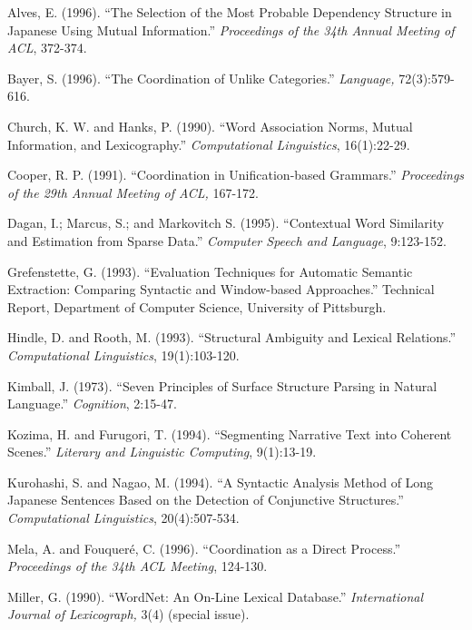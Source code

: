 \begin{thebibliography}{18}



Alves, E.  (1996). ``The Selection of 
the Most Probable Dependency Structure in Japanese Using Mutual
Information.'' {\it Proceedings of the 34th Annual Meeting of ACL}, 372-374.

 Bayer, S. (1996). ``The Coordination of Unlike
Categories.'' {\it Language,} 72(3):579-616.

 Church, K. W. and  Hanks, P. (1990).  ``Word
 Association Norms, Mutual Information, and Lexicography.'' 
{\it Computational Linguistics}, 16(1):22-29.

 Cooper, R. P. (1991). ``Coordination in
Unification-based Grammars.'' {\it
Proceedings of the 29th Annual Meeting of ACL,} 167-172.

 Dagan, I.; Marcus, S.; and Markovitch S. (1995).
``Contextual Word Similarity and 
Estimation from Sparse Data.'' {\it Computer Speech and Language},
9:123-152.

 Grefenstette, G. (1993). ``Evaluation Techniques for Automatic
Semantic Extraction: Comparing Syntactic and Window-based Approaches.''
Technical Report, Department of Computer Science, University of
Pittsburgh. 

 Hindle, D. and Rooth, M. (1993). ``Structural Ambiguity
and Lexical Relations.'' {\em Computational Linguistics}, 19(1):103-120.


 Kimball, J. (1973). ``Seven Principles of Surface
Structure Parsing in Natural Language.'' {\it Cognition}, 2:15-47.


 Kozima, H. and Furugori, T. (1994). ``Segmenting
Narrative Text into Coherent Scenes.'' {\it Literary and Linguistic
Computing}, 9(1):13-19.


 Kurohashi, S. and Nagao, M. (1994). ``A Syntactic Analysis
Method of Long Japanese Sentences Based on the Detection of Conjunctive
Structures.'' {\it Computational Linguistics}, 20(4):507-534.


 Mela, A. and Fouquer\'e, C. (1996). ``Coordination as a
Direct Process.'' {\it Proceedings of the 34th ACL Meeting}, 124-130. 


 Miller, G. (1990). ``WordNet: An On-Line Lexical
Database.'' {\it International 
Journal of Lexicograph,} 3(4) (special issue).



\end{thebibliography}
